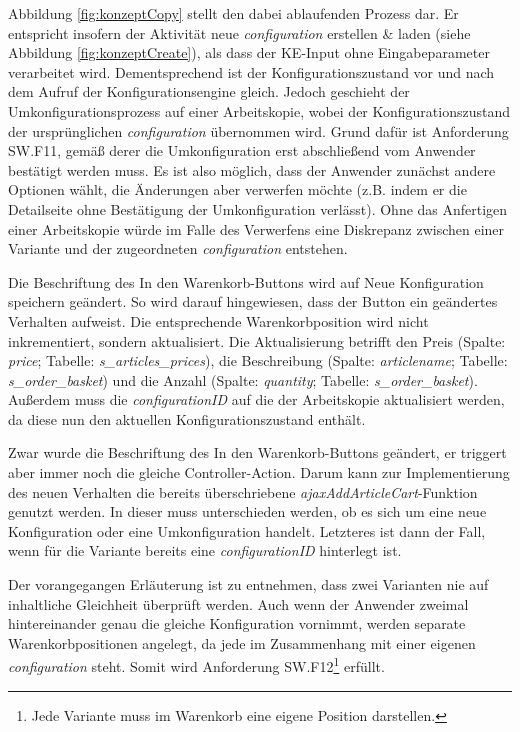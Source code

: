 \documentclass[11pt, a4paper, titlepage, listof=totoc, bibliography=totoc, index=totoc, twoside, openright, headings=normal]{scrreprt}
\begin{document}
Abbildung \ref{fig:konzeptCopy} stellt den dabei ablaufenden Prozess dar. Er entspricht insofern der Aktivität \glqq neue \emph{configuration} erstellen \& laden\grqq{} (siehe Abbildung \ref{fig:konzeptCreate}), als dass der KE-Input ohne Eingabeparameter verarbeitet wird. Dementsprechend ist der Konfigurationszustand vor und nach dem Aufruf der Konfigurationsengine gleich. Jedoch geschieht der Umkonfigurationsprozess auf einer Arbeitskopie, wobei der Konfigurationszustand der ursprünglichen \emph{configuration} übernommen wird. Grund dafür ist Anforderung SW.F11, gemäß derer die Umkonfiguration erst abschließend vom Anwender bestätigt werden muss. Es ist also möglich, dass der Anwender zunächst andere Optionen wählt, die Änderungen aber verwerfen möchte (z.B. indem er die Detailseite ohne Bestätigung der Umkonfiguration verlässt). Ohne das Anfertigen einer Arbeitskopie würde im Falle des Verwerfens eine Diskrepanz zwischen einer Variante und der zugeordneten \emph{configuration} entstehen.

Die Beschriftung des \glqq In den Warenkorb\grqq{}-Buttons wird auf \glqq Neue Konfiguration speichern\grqq{} geändert. So wird darauf hingewiesen, dass der Button ein geändertes Verhalten aufweist. Die entsprechende Warenkorbposition wird nicht inkrementiert, sondern aktualisiert. Die Aktualisierung betrifft den Preis (Spalte: \emph{price}; Tabelle: \emph{s\_articles\_prices}), die Beschreibung (Spalte: \emph{articlename}; Tabelle: \emph{s\_order\_basket}) und die Anzahl (Spalte: \emph{quantity}; Tabelle: \emph{s\_order\_basket}). Außerdem muss die \emph{configurationID} auf die der Arbeitskopie aktualisiert werden, da diese nun den aktuellen Konfigurationszustand enthält.

Zwar wurde die Beschriftung des \glqq In den Warenkorb\grqq{}-Buttons geändert, er triggert aber immer noch die gleiche Controller-Action. Darum kann zur Implementierung des neuen Verhalten die bereits überschriebene \emph{ajaxAddArticleCart}-Funktion genutzt werden. In dieser muss unterschieden werden, ob es sich um eine neue Konfiguration oder eine Umkonfiguration handelt. Letzteres ist dann der Fall, wenn für die Variante bereits eine \emph{configurationID} hinterlegt ist.

Der vorangegangen Erläuterung ist zu entnehmen, dass zwei Varianten nie auf inhaltliche Gleichheit überprüft werden. Auch wenn der Anwender zweimal hintereinander genau die gleiche Konfiguration vornimmt, werden separate Warenkorbpositionen angelegt, da jede im Zusammenhang mit einer eigenen \emph{configuration} steht. Somit wird Anforderung SW.F12\footnote{Jede Variante muss im Warenkorb eine eigene Position darstellen.} erfüllt.
\end{document}
